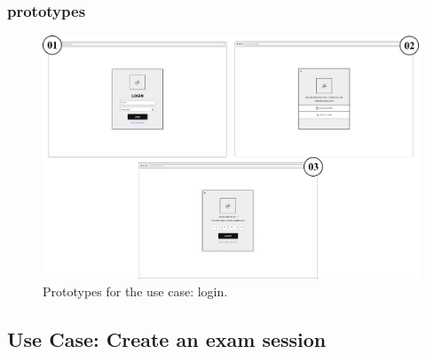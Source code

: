 \documentclass[]{uc2pfecaneva}
\begin{document}
\subsubsection{prototypes}
     \begin{figure}[h]
	
	\centering
	\includegraphics[width=\textwidth]{images/login}
	
	\caption{Prototypes for the use case: login.}
\end{figure}
\clearpage

\raggedright\subsection{Use Case: Create an exam session}
\end{document}
